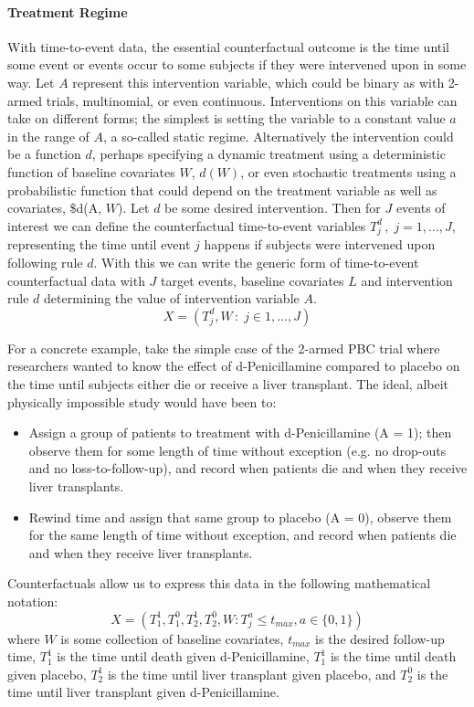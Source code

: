 \documentclass{report}
\newcommand{\1}{\ensuremath{\mathbf{1}}}
\renewcommand{\L}{\ensuremath{W}}
\begin{document}
\paragraph{Treatment Regime}
\label{TreatmentRegime}
With time-to-event data, the essential counterfactual outcome is the time until some event or events occur to some subjects if they were intervened upon in some way. Let \(A\) represent this intervention variable, which could be binary as with 2-armed trials, multinomial, or even continuous. Interventions on this variable can take on different forms; the simplest is setting the variable to a constant value \(a\) in the range of \(A\), a so-called static regime. Alternatively the intervention could be a function \(d\), perhaps specifying a dynamic treatment using a deterministic function of baseline covariates \(\L\), \(d(\L)\), or even stochastic treatments using a probabilistic function that could depend on the treatment variable as well as covariates, \$d(A, \L). Let \(d\) be some desired intervention. Then for \(J\) events of interest we can define the counterfactual time-to-event variables \(T^d_j \,,\; j = 1, ..., J\), representing the time until event \(j\) happens if subjects were intervened upon following rule \(d\). With this we can write the generic form of time-to-event counterfactual data with \(J\) target events, baseline covariates \(L\) and intervention rule \(d\) determining the value of intervention variable \(A\).
\[ X = \left( T^d_j, \L \,:\; j \in 1, \dots, J \right)\]

For a concrete example, take the simple case of the 2-armed PBC trial where researchers wanted to know the effect of d-Penicillamine compared to placebo on the time until subjects either die or receive a liver transplant. The ideal, albeit physically impossible study would have been to:
\begin{itemize}
\item Assign a group of patients to treatment with d-Penicillamine (A = 1); then observe them for some length of time without exception (e.g. no drop-outs and no loss-to-follow-up), and record when patients die and when they receive liver transplants.
\item Rewind time and assign that same group to placebo (A = 0), observe them for the same length of time without exception, and record when patients die and when they receive liver transplants.
\end{itemize}

Counterfactuals allow us to express this data in the following mathematical notation:
\[ X = (T^1_1, T^0_1, T^1_2, T^0_2, \L : T^a_j \leq t_{max},  a \in \{0, 1\}) \]
where \(\L\) is some collection of baseline covariates, \(t_{max}\) is the desired follow-up time, \(T^1_1\) is the time until death given d-Penicillamine, \(T^1_1\) is the time until death given placebo, \(T^1_2\) is the time until liver transplant given placebo, and \(T^0_2\) is the time until liver transplant given d-Penicillamine.
\end{document}
